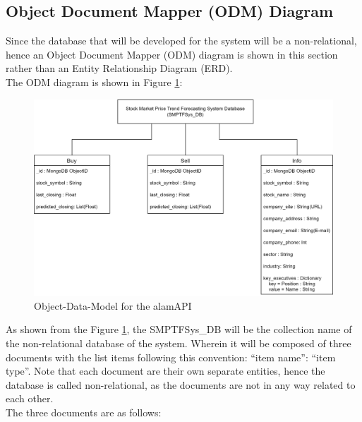 \subsection{Object Document Mapper (ODM) Diagram}
\label{subsec:odm_subsec}
Since the database that will be developed for the system will be 
a non-relational, hence an Object Document Mapper (ODM) 
diagram is shown in this section rather than an Entity Relationship Diagram (ERD).
\vspace{0.5cm}
\\The ODM diagram is shown in Figure \ref{fig:odm}:
\begin{figure}[ht]
    \centering
    \includegraphics[width=1\textwidth]{./assets/ODM.png}
    \caption{Object-Data-Model for the alamAPI}
    \label{fig:odm}
\end{figure}
\FloatBarrier
As shown from the Figure \ref{fig:odm}, the SMPTFSys\_DB will be the collection
name of the non-relational database of the system. Wherein it 
will be composed of three documents with the list items following this convention: 
“item name”: “item type”. 
Note that each document are their own separate entities, 
hence the database is called non-relational, as the documents are not in 
any way related to each other.
\vspace{0.5cm}
\\The three documents are as follows:
